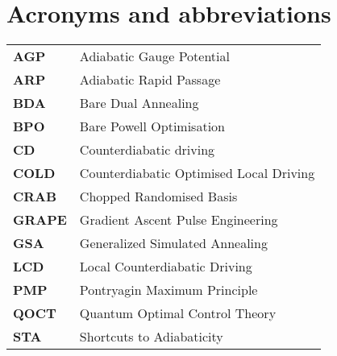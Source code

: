 \chapter{Acronyms and abbreviations}

\begin{table}[h]
      \begin{tabular}{p{3cm}  p{8cm}}

        \textbf{AGP}\label{acr:AGP} & Adiabatic Gauge Potential \\ [7pt]
        \textbf{ARP}\label{acr:ARP} & Adiabatic Rapid Passage \\ [7pt]
        \textbf{BDA}\label{acr:BDA} & Bare Dual Annealing \\[7pt]
        \textbf{BPO}\label{acr:BPO} & Bare Powell Optimisation \\[7pt]
        \textbf{CD}\label{acr:CD} & Counterdiabatic driving \\[7pt]
        \textbf{COLD}\label{acr:COLD} & Counterdiabatic Optimised Local Driving \\[7pt]
        \textbf{CRAB}\label{acr:CRAB} & Chopped Randomised Basis \\ [7pt]
        \textbf{GRAPE}\label{acr:GRAPE} & Gradient Ascent Pulse Engineering \\ [7pt]
        \textbf{GSA}\label{acr:GSA} & Generalized Simulated Annealing \\ [7pt]
        \textbf{LCD}\label{acr:LCD} & Local Counterdiabatic Driving \\[7pt]
        \textbf{PMP}\label{acr:PMP} & Pontryagin Maximum Principle \\[7pt]
        \textbf{QOCT}\label{acr:QOCT} & Quantum Optimal Control Theory \\[7pt]
        \textbf{STA}\label{acr:STA} & Shortcuts to Adiabaticity \\[7pt]

    \end{tabular}

\end{table}\label{table}